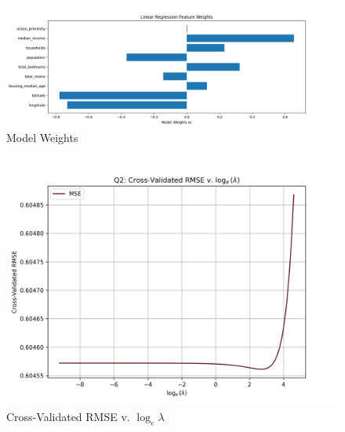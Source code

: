 \documentclass[11pt]{article}
\begin{document}
\begin{figure}[h!]
  \includegraphics[width=\textwidth]{../plots/q2_model_weights.png}
  \centering
  \caption{Model Weights}
  \label{fig:weights}
\end{figure}


\begin{figure}[h!]
  \includegraphics[width=\textwidth]{../plots/q2_crossvalmse_vs_loglambda.png}
  \centering
  \caption{Cross-Validated RMSE v. \(\log_e{\lambda}\)}
\end{figure}
\end{document}
